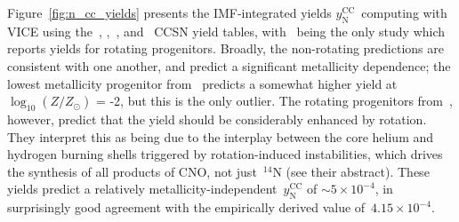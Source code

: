 \documentclass[\main/notes.tex]{subfiles}
\begin{document}
\noindent 
Figure~\ref{fig:n_cc_yields} presents the IMF-integrated yields 
$y_\text{N}^\text{CC}$~computing with VICE using the~\citet{Limongi2018}, 
\citet{Sukhbold2016},~\citet{Nomoto2013}, and~\citet{Woosley1995} CCSN yield 
tables, with~\citet{Limongi2018} being the only study which reports yields for 
rotating progenitors. Broadly, the non-rotating predictions are consistent with 
one another, and predict a significant metallicity dependence; the lowest 
metallicity progenitor from~\citet{Woosley1995} predicts a somewhat higher 
yield at~$\log_{10}(Z/Z_\odot)$ = -2, but this is the only outlier. The 
rotating progenitors from~\citet{Limongi2018}, however, predict that the 
yield should be considerably enhanced by rotation. They interpret this as being 
due to the interplay between the core helium and hydrogen burning shells 
triggered by rotation-induced instabilities, which drives the synthesis of all 
products of CNO, not just~$^{14}$N (see their abstract). These yields predict a 
relatively metallicity-independent~$y_\text{N}^\text{CC}$ of 
$\sim5\times10^{-4}$, in surprisingly good agreement with the empirically 
derived value of~$4.15\times10^{-4}$. 
\end{document}
